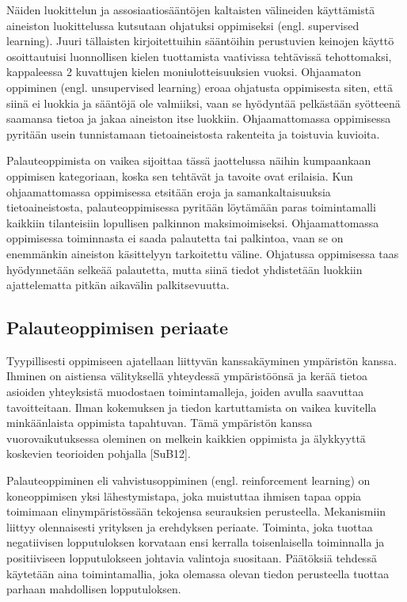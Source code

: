 \documentclass[finnish]{tktltiki2}
\theoremstyle{definition}
\theoremstyle{remark}
\begin{document}
Näiden luokittelun ja assosiaatiosääntöjen kaltaisten välineiden käyttämistä aineiston luokittelussa kutsutaan ohjatuksi oppimiseksi (engl. supervised learning). Juuri tällaisten kirjoitettuihin sääntöihin perustuvien keinojen käyttö osoittautuisi luonnollisen kielen tuottamista vaativissa tehtävissä tehottomaksi, kappaleessa 2 kuvattujen kielen moniulotteisuuksien vuoksi. Ohjaamaton oppiminen (engl. unsupervised learning) eroaa ohjatusta oppimisesta siten, että siinä ei luokkia ja sääntöjä ole valmiiksi, vaan se hyödyntää pelkästään syötteenä saamansa tietoa ja jakaa aineiston itse luokkiin. Ohjaamattomassa oppimisessa pyritään usein tunnistamaan tietoaineistosta rakenteita ja toistuvia kuvioita. 
 
Palauteoppimista on vaikea sijoittaa tässä jaottelussa näihin kumpaankaan oppimisen kategoriaan, koska sen tehtävät ja tavoite ovat erilaisia. Kun ohjaamattomassa oppimisessa etsitään eroja ja samankaltaisuuksia tietoaineistosta, palauteoppimisessa pyritään löytämään paras toimintamalli kaikkiin tilanteisiin lopullisen palkinnon maksimoimiseksi. Ohjaamattomassa oppimisessa toiminnasta ei saada palautetta tai palkintoa, vaan se on enemmänkin aineiston käsittelyyn tarkoitettu väline. Ohjatussa oppimisessa taas hyödynnetään selkeää palautetta, mutta siinä tiedot yhdistetään luokkiin ajattelematta pitkän aikavälin palkitsevuutta.

\subsection{Palauteoppimisen periaate}

Tyypillisesti oppimiseen ajatellaan liittyvän kanssakäyminen ympäristön kanssa. Ihminen on aistiensa välityksellä yhteydessä ympäristöönsä ja kerää tietoa asioiden yhteyksistä muodostaen toimintamalleja, joiden avulla saavuttaa tavoitteitaan. Ilman kokemuksen ja tiedon kartuttamista on vaikea kuvitella minkäänlaista oppimista tapahtuvan. Tämä ympäristön kanssa vuorovaikutuksessa oleminen on melkein kaikkien oppimista ja älykkyyttä koskevien teorioiden pohjalla [SuB12]. 
 
Palauteoppiminen eli vahvistusoppiminen (engl. reinforcement learning) on koneoppimisen yksi lähestymistapa, joka muistuttaa ihmisen tapaa oppia toimimaan elinympäristössään tekojensa seurauksien perusteella. Mekanismiin liittyy olennaisesti yrityksen ja erehdyksen periaate. Toiminta, joka tuottaa negatiivisen lopputuloksen korvataan ensi kerralla toisenlaisella toiminnalla ja positiiviseen lopputulokseen johtavia valintoja suositaan. Päätöksiä tehdessä käytetään aina toimintamallia, joka olemassa olevan tiedon perusteella tuottaa parhaan mahdollisen lopputuloksen. 
 
\end{document}
